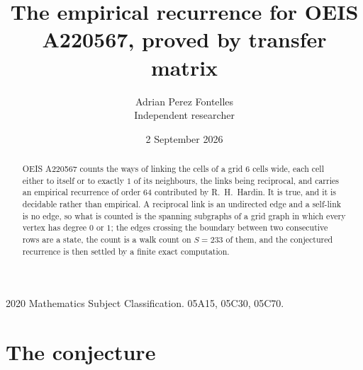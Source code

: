 \documentclass[11pt,a4paper]{article}
\title{The empirical recurrence for OEIS A220567, proved by transfer matrix}
\author{Adrian Perez Fontelles\\ \small Independent researcher}
\date{2 September 2026}
\theoremstyle{plain}
\theoremstyle{definition}
\begin{document}
\maketitle

\begin{abstract}
OEIS A220567 counts the ways of linking the cells of a grid $6$ cells wide, each cell either to
itself or to exactly $1$ of its neighbours, the links being reciprocal, and carries an
empirical recurrence of order $64$ contributed by R.~H.~Hardin. It is true, and it is
decidable rather than empirical. A reciprocal link is an undirected edge and a self-link is
no edge, so what is counted is the spanning subgraphs of a grid graph in which every vertex
has degree $0$ or $1$; the edges crossing the boundary between two consecutive rows are a
state, the count is a walk count on $S=233$ of them, and the conjectured recurrence is then
settled by a finite exact computation.
\end{abstract}

\noindent\small 2020 Mathematics Subject Classification. 05A15, 05C30, 05C70.\normalsize

\section{The conjecture}
\end{document}
